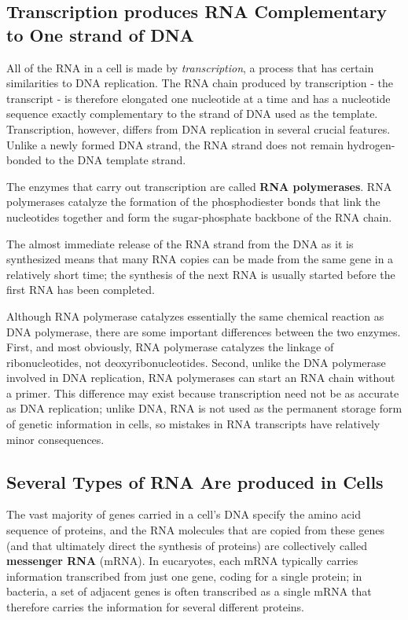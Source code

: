 \subsection{Transcription produces RNA Complementary to One strand of DNA}

All of the RNA in a cell is made by \textit{transcription}, a process that has certain
similarities to DNA replication.
The RNA chain produced by transcription - the transcript - is therefore
elongated one nucleotide at a time and has a nucleotide sequence exactly
complementary to the strand of DNA used as the template.
Transcription, however, differs from DNA replication in several crucial
features. Unlike a newly formed DNA strand, the RNA strand does not
remain hydrogen-bonded to the DNA template strand.

The enzymes that carry out transcription are called \textbf{RNA polymerases}.
RNA polymerases catalyze the formation of the phosphodiester bonds that
link the nucleotides together and form the sugar-phosphate
backbone of the RNA chain.

The almost immediate release of the RNA strand from the DNA as it is
synthesized means that many RNA copies can be made from the same
gene in a relatively short time; the synthesis of the next RNA is usually
started before the first RNA has been completed.

Although RNA polymerase catalyzes essentially the same chemical reaction
as DNA polymerase, there are some important differences between
the two enzymes. First, and most obviously, RNA polymerase catalyzes
the linkage of ribonucleotides, not deoxyribonucleotides. Second, unlike
the DNA polymerase involved in DNA replication, RNA polymerases can
start an RNA chain without a primer. This difference may exist because
transcription need not be as accurate as DNA replication; unlike DNA,
RNA is not used as the permanent storage form of genetic information in
cells, so mistakes in RNA transcripts have relatively minor consequences.

\subsection{Several Types of RNA Are produced in Cells}

The vast majority of genes carried in a cell’s DNA specify the amino
acid sequence of proteins, and the RNA molecules that are copied from
these genes (and that ultimately direct the synthesis of proteins) are collectively
called \textbf{messenger RNA} (mRNA). In eucaryotes, each mRNA
typically carries information transcribed from just one gene, coding for a
single protein; in bacteria, a set of adjacent genes is often transcribed as
a single mRNA that therefore carries the information for several different
proteins.

